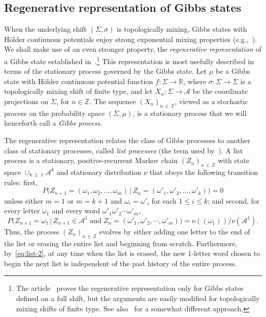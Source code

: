 \documentclass[10pt]{amsart}
\theoremstyle{definition}\newtheorem{defi}[theo]{Definition}\newtheorem{rema}[theo]{Remark}\newtheorem{exam}[theo]{Example}\newtheorem{exem}[theo]{Example}\newtheorem{nota}[theo]{Notation}
\newcommand{\zz}[1]{\mathbb #1}
\begin{document}
\subsection{Regenerative representation of Gibbs states}\label{ssec:regeneration}

When the underlying shift $(\Sigma,\sigma)$ is topologically mixing, Gibbs states with H\"older continuous potentials enjoy strong exponential mixing properties (e.g.,~\cite[the ``exponential cluster property''~1.26 in Chapter~1]{bowen:book}). We shall make use of an even stronger property, the \emph{regenerative representation} of a Gibbs state established in~\cite{lalley:regeneration}.\footnote{The article~\cite{lalley:regeneration} proves the regenerative representation only for Gibbs states defined on a full shift, but the arguments are easily modified for topologically mixing shifts of finite type. See also~\cite{comets-et-al} for a somewhat different approach.} This representation is most usefully described in terms of the stationary process governed by the Gibbs state. Let $\mu$ be a Gibbs state with H\"older continuous potential function $f:\Sigma \rightarrow \mathbb{R}$, where $\sigma :\Sigma \rightarrow \Sigma$ is a topologically mixing shift of finite type, and let $X_{n}:\Sigma \rightarrow \mathcal{A}$ be the coordinate projections on $\Sigma$, for $n\in \zz{Z}$. The sequence $(X_{n})_{n\,\in\,\zz{Z}}$, viewed as a stochastic process on the probability space $(\Sigma,\mu)$, is a stationary process that we will henceforth call a \emph{Gibbs process}.

The regenerative representation relates the class of Gibbs processes to another class of stationary processes, called \emph{list processes} (the term used by~\cite{lalley:regeneration}). A list process is a stationary, positive-recurrent Markov chain $(Z_{n})_{n\,\in\,\zz{Z}}$ with state space $\cup_{k\,\geq\,1}\mathcal{A}^{k}$ and stationary distribution $\nu$ that obeys the following transition rules: first,
\begin{equation}\label{eq:list-1}
P \big(Z_{n+1}= (\omega_{1},\omega_{2},\dotsc,\omega_{m})\,\big|\, Z_{n}= (\omega '_{1},\omega '_{2},\dotsc, \omega '_{k})\big)=0
\end{equation}
unless either $m=1$ or $m=k+1$ and $\omega_{i}=\omega '_{i}$ for each $1\leq i\leq k$; and second, for every letter $\omega_{1}$ and every word $\omega '_{1}\omega '_{2}\dotsb \omega '_{m}$,
\begin{equation}\label{eq:list-2}
P \big(Z_{n+1}=\omega_{1}\,\big|\, Z_{n+1}\in \mathcal{A}^{1} \;\text{and}\; Z_{n}= (\omega '_{1},\omega '_{2},\dotsb,\omega '_{m})\big) =\nu ((\omega_{1}))/\nu (\mathcal{A}^{1}).
\end{equation}
Thus, the process $(Z_{n})_{n\,\in\,\zz{Z}}$ evolves by either adding one letter to the end of the list or erasing the entire list and beginning from scratch. Furthermore, by~\eqref{eq:list-2}, at any time when the list is erased, the new 1-letter word chosen to begin the next list is independent of the past history of the entire process.
\end{document}

